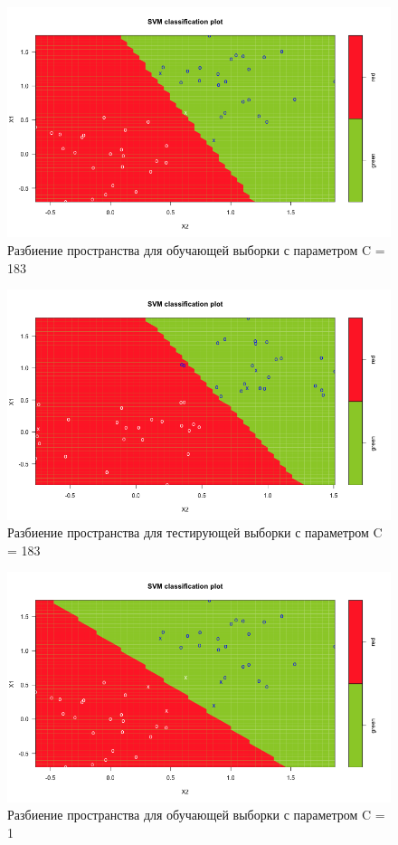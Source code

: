 \documentclass[]{article}
\numberwithin{equation}{section}
\begin{document}
        \begin{figure}[H]
            \centering
            \includegraphics[width = 0.9\linewidth]{data/data2_train_set_183.png}
            \caption{Разбиение пространства для обучающей выборки с параметром C = 183}
        \end{figure}
        \begin{figure}[H]
            \centering
            \includegraphics[width = 0.9\linewidth]{data/data2_test_set_183.png}
            \caption{Разбиение пространства для тестирующей выборки с параметром C = 183}
        \end{figure}
        \begin{figure}[H]
            \centering
            \includegraphics[width = 0.9\linewidth]{data/data2_train_set_1.png}
            \caption{Разбиение пространства для обучающей выборки с параметром C = 1}
        \end{figure}
\end{document}

